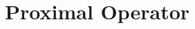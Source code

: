\documentclass[11pt]{book}
\begin{document}
\appendix






\chapter{Proximal Operator}
\end{document}
